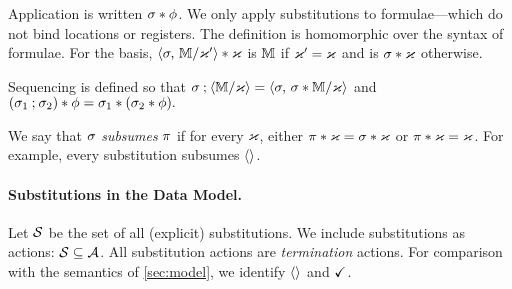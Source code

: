Application is written $\sigma\mathbin{\ast}\phi$.  We only apply substitutions to
formulae---which do not bind locations or registers.  The definition is
homomorphic over the syntax of formulae. For the basis, 
\begin{math}
  \langle\sigma,\,\mathbb{M}/\varkappa'\rangle\mathbin{\ast}\varkappa
\end{math}
is $\mathbb{M}$ if $\varkappa'=\varkappa$ and is $\sigma \mathbin{\ast}\varkappa$ otherwise.


Sequencing is defined so that
\begin{math}
  \sigma\mathbin{;}\langle\mathbb{M}/\varkappa\rangle
  \allowbreak= 
  \langle\sigma,\,\sigma\mathbin{\ast}\mathbb{M}/\varkappa\rangle
\end{math}
and
\begin{math}
  (\sigma_1\mathbin{;}\sigma_2)\mathbin{\ast}\phi = \sigma_1\mathbin{\ast}(\sigma_2\mathbin{\ast}\phi).
\end{math}

We say that $\sigma$ \emph{subsumes} $\pi$ if for every $\varkappa$, either
$\pi\mathbin{\ast}\varkappa=\sigma\mathbin{\ast}\varkappa$ or $\pi\mathbin{\ast}\varkappa=\varkappa$.
For example, every substitution subsumes $\langle\rangle$.

\paragraph{Substitutions in the Data Model.}
Let $\mathcal{S}$ be the set of all (explicit) substitutions.  We include
substitutions as actions: $\mathcal{S}\subseteq\mathcal{A}$.  All substitution actions are
\emph{termination} actions.  For comparison with the semantics of
\textsection\ref{sec:model}, we identify $\langle\rangle$ and $\checkmark$.

